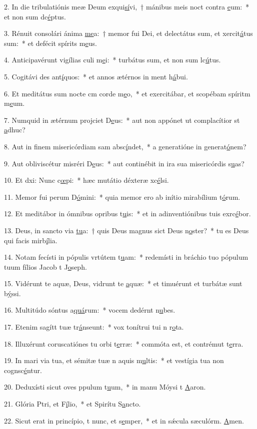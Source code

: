 2. In die tribulatiónis meæ Deum exqui\uline{sí}vi,~† mánibus meis noct contra \uline{e}um:~* et non sum dc\uline{é}ptus.\par 
3. Rénuit consolári ánima \uline{me}a:~† memor fui Dei, et delectátus sum, et xercit\uline{á}tus sum:~* et defécit spírits m\uline{e}us.\par 
4. Anticipavérunt vigílias culi m\uline{e}i:~* turbátus sum, et non sum lc\uline{ú}tus.\par 
5. Cogitávi des ant\uline{í}quos:~* et annos ætérnos in ment h\uline{á}bui.\par 
6. Et meditátus sum nocte cm corde m\uline{e}o,~* et exercitábar, et scopébam spíritm m\uline{e}um.\par 
7. Numquid in ætérnum projciet D\uline{e}us:~* aut non appónet ut complacítior st \uline{a}dhuc?\par 
8. Aut in finem misericórdiam sam absc\uline{í}ndet,~* a generatióne in generat\uline{ó}nem?\par 
9. Aut obliviscétur misréri D\uline{e}us:~* aut continébit in ira sua misericórdis s\uline{u}as?\par 
10. Et dxi: Nunc c\uline{œ}pi:~* hæc mutátio déxteræ xc\uline{é}lsi.\par 
11. Memor fui perum D\uline{ó}mini:~* quia memor ero ab inítio mirabílium t\uline{ó}rum.\par 
12. Et meditábor in ómnibus opribus t\uline{u}is:~* et in adinventiónibus tuis exrc\uline{é}bor.\par 
13. Deus, in sancto via \uline{tu}a:~† quis Deus magnus sict Deus n\uline{o}ster?~* tu es Deus qui facis mirb\uline{í}lia.\par 
14. Notam fecísti in pópulis vrtútem t\uline{u}am:~* redemísti in bráchio tuo pópulum tuum fílios Jacob t J\uline{o}seph.\par 
15. Vidérunt te aquæ, Deus, vidrunt te \uline{a}quæ:~* et timuérunt et turbátæ sunt b\uline{ý}ssi.\par 
16. Multitúdo sóntus a\uline{quá}rum:~* vocem dedérnt n\uline{u}bes.\par 
17. Etenim sagítt tuæ tr\uline{á}nseunt:~* vox tonítrui tui n r\uline{o}ta.\par 
18. Illuxérunt coruscatiónes tu orbi t\uline{e}rræ:~* commóta est, et contrémut t\uline{e}rra.\par 
19. In mari via tua, et sémitæ tuæ n aquis m\uline{u}ltis:~* et vestígia tua non cognsc\uline{é}ntur.\par 
20. Deduxísti sicut oves ppulum t\uline{u}um,~* in manu Móysi t \uline{A}aron.\par 
21. Glória Ptri, et F\uline{í}lio,~* et Spirítu S\uline{a}ncto.\par 
22. Sicut erat in princípio, t nunc, et s\uline{e}mper,~* et in sǽcula sæculórm. \uline{A}men.\par 
